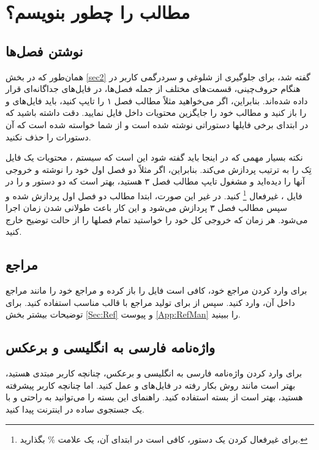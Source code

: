 \section[مطالب پروژه را چطور بنویسم؟]
{مطالب \پ را چطور بنویسم؟}
\subsection{نوشتن فصل‌ها}
همان‌طور که در بخش \ref{sec2} گفته شد، برای جلوگیری از شلوغی و سردرگمی کاربر در هنگام حروف‌چینی، قسمت‌های مختلف \پ از جمله فصل‌ها، در فایل‌های جداگانه‌ای قرار داده شده‌اند. 
بنابراین، اگر می‌خواهید مثلاً مطالب فصل ۱ را تایپ کنید، باید فایل‌های 
و
را باز کنید و مطالب خود را جایگزین محتویات داخل فایل 
نمایید. دقت داشته باشید که در ابتدای برخی فایلها دستوراتی نوشته شده است و از شما خواسته شده است که آن دستورات را حذف نکنید.


نکته بسیار مهمی که در اینجا باید گفته شود این است که سیستم \lr{\TeX}، محتویات یک فایل تِک را به ترتیب پردازش می‌کند.  بنابراین، اگر مثلاً  دو فصل اول خود را نوشته و خروجی آنها را دیده‌اید و مشغول تایپ مطالب فصل ۳ هستید، بهتر است
که دو دستور 
\verb!!
و
\verb!!
را در فایل 
،
غیرفعال%
\footnote{
برای غیرفعال کردن یک دستور، کافی است در ابتدای آن، یک علامت
\%
 بگذارید.
}
 کنید.  در غیر این صورت، ابتدا مطالب دو فصل اول  پردازش شده و سپس مطالب فصل ۳ پردازش می‌شود و این کار باعث طولانی شدن زمان اجرا می‌شود. هر زمان که خروجی کل \پ خود را خواستید تمام فصلها را از حالت توضیح خارج کنید.

\subsection{مراجع}
برای وارد کردن مراجع \پ خود، کافی است فایل 
را باز کرده و مراجع خود را مانند مراجع داخل آن، وارد کنید.  سپس از  برای تولید مراجع با قالب مناسب استفاده کنید. برای توضیحات بیشتر بخش \ref{Sec:Ref} و پیوست \ref{App:RefMan} را ببینید.


\subsection{واژه‌نامه فارسی به انگلیسی و برعکس}
برای وارد کردن واژه‌نامه فارسی به انگلیسی و برعکس، چنانچه کاربر مبتدی هستید، بهتر است مانند روش بکار رفته در فایل‌های 
و
عمل کنید. اما چنانچه کاربر پیشرفته هستید، بهتر است از بسته
استفاده کنید. راهنمای این بسته را می‌توانید به راحتی و با یک جستجوی ساده در اینترنت پیدا کنید.
